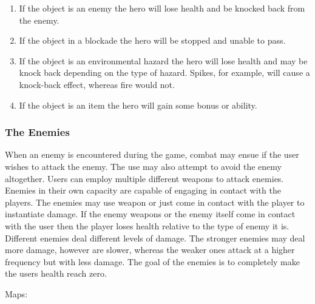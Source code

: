 \documentclass[12pt, titlepage]{article}
\begin{document}
\begin{enumerate}
  \item If the object is an enemy the hero will lose health and be knocked back from the enemy.
  \item If the object in a blockade the hero will be stopped and unable to pass.
  \item If the object is an environmental hazard the hero will lose health and may be knock back depending on the type of hazard.  Spikes, for example, will cause a knock-back effect, whereas fire would not.
  \item If the object is an item the hero will gain some bonus or ability.  
\end{enumerate}




\subsubsection{The Enemies}
	When an enemy is encountered during the game, combat may ensue if the user wishes to attack the enemy.  The use may also attempt to avoid the enemy altogether. Users can employ multiple different weapons to attack enemies. Enemies in their own capacity are capable of engaging in contact with the players. The enemies may use weapon or just come in contact with the player to instantiate damage. If the enemy weapons or the enemy itself come in contact with the user then the player loses health relative to the type of enemy it is. Different enemies deal different levels of damage. The stronger enemies may deal more damage, however are slower, whereas the weaker ones attack at a higher frequency but with less damage. The goal of the enemies is to completely make the users health reach zero.

Maps:

\end{document}
